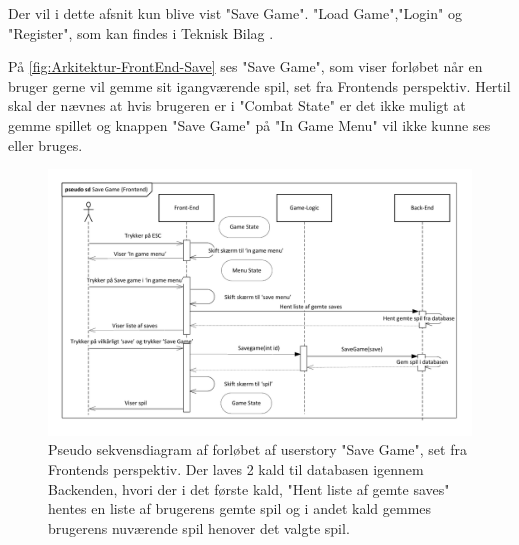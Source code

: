 Der vil i dette afsnit kun blive vist "Save Game". "Load Game","Login" og "Register", som kan findes i Teknisk Bilag \parencite[][Section 9.2.1]{TekniskBilag}.

\noindent På \autoref{fig:Arkitektur-FrontEnd-Save} ses "Save Game", som viser forløbet når en bruger gerne vil gemme sit igangværende spil, set fra Frontends perspektiv. 
Hertil skal der nævnes at hvis brugeren er i "Combat State" er det ikke muligt at gemme spillet og knappen "Save Game" på "In Game Menu" vil ikke kunne ses eller bruges.\\

\begin{figure}[H]
\centering
\includegraphics[width = \textwidth]{02-Body/Images/Front-End_-_Arkitektur-savegame.pdf}
\caption{Pseudo sekvensdiagram af forløbet af userstory "Save Game", set fra Frontends perspektiv. Der laves 2 kald til databasen igennem Backenden, hvori der i det første kald,  "Hent liste af gemte saves" hentes en liste af brugerens gemte spil og i andet kald gemmes brugerens nuværende spil henover det valgte spil.}
\label{fig:Arkitektur-FrontEnd-Save}
\end{figure}

\newpage
